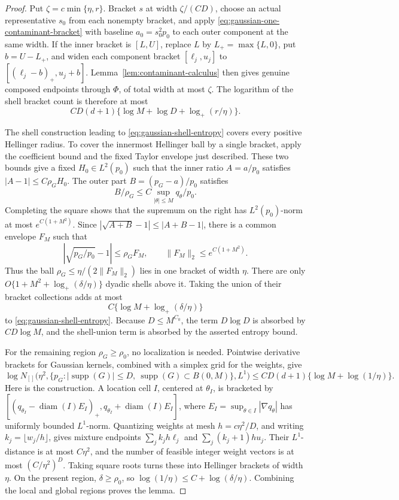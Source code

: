 \documentclass[11pt]{article}
\theoremstyle{definition}
\numberwithin{equation}{section}
\DeclareMathOperator{\supp}{supp}
\begin{document}
\begin{proof}
Put \(\zeta=c\min\{\eta,r\}\). Bracket \(s\) at width
\(\zeta/(CD)\), choose an actual representative \(s_0\) from each nonempty
bracket, and apply \eqref{eq:gaussian-one-contaminant-bracket} with baseline
\(a_0=s_0^2p_0\) to each outer component at the same width. If the inner
bracket is \([L,U]\), replace \(L\) by \(L_+=\max\{L,0\}\), put
\(b=U-L_+\), and widen each component bracket \([\ell_j,u_j]\) to
\([(\ell_j-b)_+,u_j+b]\). Lemma~\ref{lem:contaminant-calculus} then gives
genuine composed endpoints through \(\Phi\), of total width at most \(\zeta\).
The logarithm of the shell bracket count is therefore at most
\begin{equation}
\label{eq:gaussian-shell-entropy}
 CD(d+1)\{\log M+\log D+\log_+(r/\eta)\}.
\end{equation}

The shell construction leading to
\eqref{eq:gaussian-shell-entropy} covers every positive Hellinger radius. To
cover the innermost Hellinger ball by a single bracket, apply the coefficient
bound and the fixed Taylor envelope just described. These two bounds give a fixed
\(H_0\in L^2(p_0)\) such that the inner ratio \(A=a/p_0\) satisfies
\(|A-1|\le C\rho_GH_0\). The outer part \(B=(p_G-a)/p_0\) satisfies
\[
 B/\rho_G\le C\sup_{|\theta|\le M}q_\theta/p_0.
\]
Completing the square shows that the supremum on the right has
\(L^2(p_0)\)-norm at most \(e^{C(1+M^2)}\). Since
\(|\sqrt{A+B}-1|\le|A+B-1|\), there is a common envelope \(F_M\) such that
\[
 |\sqrt{p_G/p_0}-1|\le\rho_GF_M,
 \qquad \|F_M\|_2\le e^{C(1+M^2)}.
\]
Thus the ball \(\rho_G\le\eta/(2\|F_M\|_2)\) lies in one bracket of width
\(\eta\). There are only
\(O\{1+M^2+\log_+(\delta/\eta)\}\) dyadic shells above it. Taking the union
of their bracket collections adds at most
\[
 C\{\log M+\log_+(\delta/\eta)\}
\]
to \eqref{eq:gaussian-shell-entropy}. Because \(D\le M^{C_0}\), the term
\(D\log D\) is absorbed by \(CD\log M\), and the shell-union term is
absorbed by the asserted entropy bound.

For the remaining region \(\rho_G\ge\rho_0\), no localization is needed.
Pointwise derivative brackets for Gaussian kernels, combined with a simplex
grid for the weights, give
\[
 \log N_{[]}\bigl(\eta^2,
 \{p_G:|\supp(G)|\le D,\ \supp(G)\subset B(0,M)\},L^1\bigr)
 \le CD(d+1)\{\log M+\log(1/\eta)\}.
\]
Here is the construction. A location cell \(I\), centered at \(\theta_I\),
is bracketed by
\([(q_{\theta_I}-\operatorname{diam}(I)E_I)_+,
q_{\theta_I}+\operatorname{diam}(I)E_I]\), where
\(E_I=\sup_{\theta\in I}|\nabla q_\theta|\) has uniformly bounded
\(L^1\)-norm. Quantizing weights at mesh \(h=c\eta^2/D\), and writing
\(k_j=\lfloor w_j/h\rfloor\), gives mixture endpoints
\(\sum_jk_jh\ell_j\) and \(\sum_j(k_j+1)hu_j\). Their \(L^1\)-distance is
at most \(C\eta^2\), and the number of feasible integer weight vectors is
at most \((C/\eta^2)^D\).
Taking square roots turns these into Hellinger brackets of width \(\eta\).
On the present region, \(\delta\ge\rho_0\), so
\(\log(1/\eta)\le C+\log(\delta/\eta)\). Combining the local and global
regions proves the lemma.
\end{proof}
\end{document}
